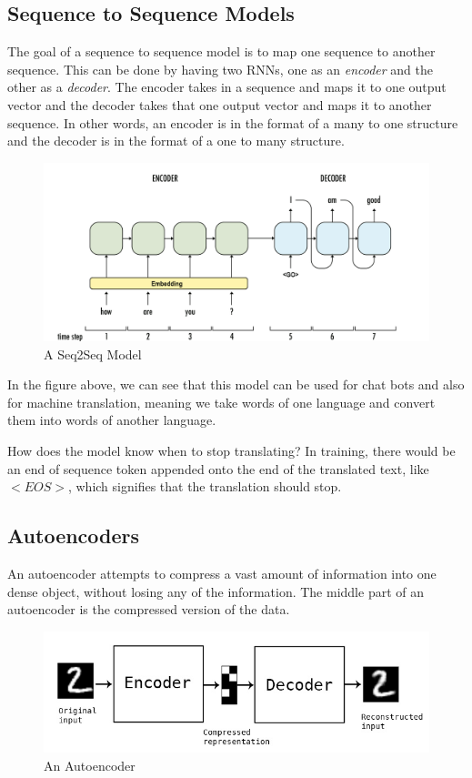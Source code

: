 \documentclass{article}
\begin{document}
\subsection{Sequence to Sequence Models}
The goal of a sequence to sequence model is to map one sequence to another sequence. This can be done by having two RNNs, one as an \textit{encoder} and the other as a \textit{decoder}. The encoder takes in a sequence and maps it to one output vector and the decoder takes that one output vector and maps it to another sequence. In other words, an encoder is in the format of a many to one structure and the decoder is in the format of a one to many structure.

\begin{figure}[H]
\centering
\includegraphics[scale=0.2]{seq2seq.png}
\caption{A Seq2Seq Model}
\label{fig:seq2seq}
\end{figure}

In the figure above, we can see that this model can be used for chat bots and also for machine translation, meaning we take words of one language and convert them into words of another language.

How does the model know when to stop translating? In training, there would be an end of sequence token appended onto the end of the translated text, like $<EOS>$, which signifies that the translation should stop.

\subsection{Autoencoders}
An autoencoder attempts to compress a vast amount of information into one dense object, without losing any of the information. The middle part of an autoencoder is the compressed version of the data.


\begin{figure}[H]
\centering
\includegraphics[scale=1.8]{autoencoder.jpg}
\caption{An Autoencoder}
\label{fig:autoencoder}
\end{figure}
\end{document}
